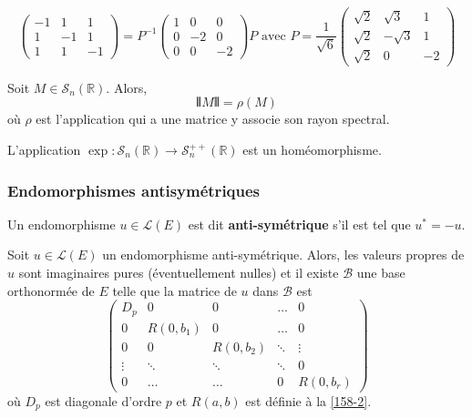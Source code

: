 
  \begin{example}
    \[ \begin{pmatrix} -1 & 1 & 1 \\ 1 & -1 & 1 \\ 1 & 1 & -1 \end{pmatrix} = P^{-1} \begin{pmatrix} 1 & 0 & 0 \\ 0 & -2 & 0 \\ 0 & 0 & -2 \end{pmatrix} P \text{ avec } P = \frac{1}{\sqrt{6}} \begin{pmatrix} \sqrt{2} & \sqrt{3} & 1 \\ \sqrt{2} & -\sqrt{3} & 1 \\ \sqrt{2} & 0 & -2 \end{pmatrix} \]
  \end{example}


  \begin{lemma}
    Soit $M \in \mathcal{S}_n(\mathbb{R})$. Alors,
    \[ \VERT M \VERT = \rho(M) \]
    où $\rho$ est l'application qui a une matrice y associe son rayon spectral.
  \end{lemma}


  \begin{theorem}
    L'application $\exp : \mathcal{S}_n(\mathbb{R}) \rightarrow \mathcal{S}^{++}_n(\mathbb{R})$ est un homéomorphisme.
  \end{theorem}

  \subsubsection{Endomorphismes antisymétriques}


  \begin{definition}
    Un endomorphisme $u \in \mathcal{L}(E)$ est dit \textbf{anti-symétrique} s'il est tel que $u^* = -u$.
  \end{definition}


  \begin{theorem}
    Soit $u \in \mathcal{L}(E)$ un endomorphisme anti-symétrique. Alors, les valeurs propres de $u$ sont imaginaires pures (éventuellement nulles) et il existe $\mathcal{B}$ une base orthonormée de $E$ telle que la matrice de $u$ dans $\mathcal{B}$ est
    \[ \begin{pmatrix} D_p & 0 & 0 & \dots & 0 \\ 0 & R(0,b_1) & 0 & \dots & 0 \\ 0 & 0 & R(0,b_2) & \ddots & \vdots \\ \vdots & \ddots & \ddots & \ddots & 0 \\ 0 & \dots & \dots & 0 & R(0,b_r) \end{pmatrix} \]
    où $D_p$ est diagonale d'ordre $p$ et $R(a,b)$ est définie à la \cref{158-2}.
  \end{theorem}


